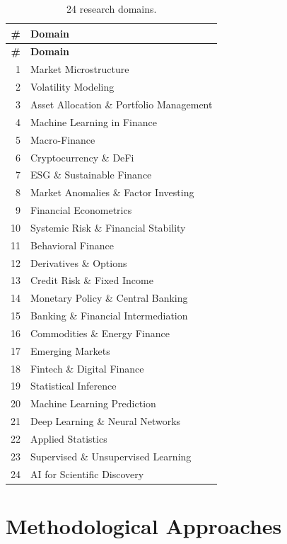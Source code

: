 \begin{longtable}{rl}
\caption{24 research domains.} \label{tab:domains} \\
\toprule
\textbf{\#} & \textbf{Domain} \\
\midrule
\endfirsthead
\toprule
\textbf{\#} & \textbf{Domain} \\
\midrule
\endhead
1 & Market Microstructure \\
2 & Volatility Modeling \\
3 & Asset Allocation \& Portfolio Management \\
4 & Machine Learning in Finance \\
5 & Macro-Finance \\
6 & Cryptocurrency \& DeFi \\
7 & ESG \& Sustainable Finance \\
8 & Market Anomalies \& Factor Investing \\
9 & Financial Econometrics \\
10 & Systemic Risk \& Financial Stability \\
11 & Behavioral Finance \\
12 & Derivatives \& Options \\
13 & Credit Risk \& Fixed Income \\
14 & Monetary Policy \& Central Banking \\
15 & Banking \& Financial Intermediation \\
16 & Commodities \& Energy Finance \\
17 & Emerging Markets \\
18 & Fintech \& Digital Finance \\
19 & Statistical Inference \\
20 & Machine Learning Prediction \\
21 & Deep Learning \& Neural Networks \\
22 & Applied Statistics \\
23 & Supervised \& Unsupervised Learning \\
24 & AI for Scientific Discovery \\
\bottomrule
\end{longtable}

\section{Methodological Approaches}
\label{sec:prompts:methods}

